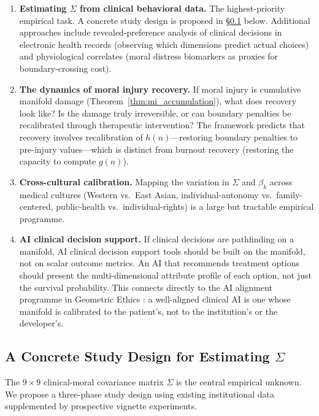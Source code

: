 \documentclass[12pt]{article}
\theoremstyle{definition}
\theoremstyle{remark}
\begin{document}
\begin{enumerate}
    \item \textbf{Estimating $\Sigma$ from clinical behavioral data.}  The highest-priority empirical task.  A concrete study design is proposed in \S\ref{sec:sigma_study} below.  Additional approaches include revealed-preference analysis of clinical decisions in electronic health records (observing which dimensions predict actual choices) and physiological correlates (moral distress biomarkers as proxies for boundary-crossing cost).

    \item \textbf{The dynamics of moral injury recovery.}  If moral injury is cumulative manifold damage (Theorem~\ref{thm:mi_accumulation}), what does recovery look like?  Is the damage truly irreversible, or can boundary penalties be recalibrated through therapeutic intervention?  The framework predicts that recovery involves recalibration of $h(n)$---restoring boundary penalties to pre-injury values---which is distinct from burnout recovery (restoring the capacity to compute $g(n)$).

    \item \textbf{Cross-cultural calibration.}  Mapping the variation in $\Sigma$ and $\beta_k$ across medical cultures (Western vs.\ East Asian, individual-autonomy vs.\ family-centered, public-health vs.\ individual-rights) is a large but tractable empirical programme.

    \item \textbf{AI clinical decision support.}  If clinical decisions are pathfinding on a manifold, AI clinical decision support tools should be built on the manifold, not on scalar outcome metrics.  An AI that recommends treatment options should present the multi-dimensional attribute profile of each option, not just the survival probability.  This connects directly to the AI alignment programme in Geometric Ethics \cite{bond2026geometric}: a well-aligned clinical AI is one whose manifold is calibrated to the patient's, not to the institution's or the developer's.
\end{enumerate}


\subsection{A Concrete Study Design for Estimating $\Sigma$}
\label{sec:sigma_study}

The $9 \times 9$ clinical-moral covariance matrix $\Sigma$ is the central empirical unknown.  We propose a three-phase study design using existing institutional data supplemented by prospective vignette experiments.
\end{document}
